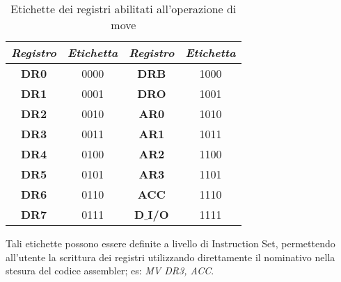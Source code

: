\begin{table}[H]
	\centering
	\fontsize{10}{18}\selectfont
	\begin{tabular}{|p{25mm}|p{25mm}|p{25mm}|p{25mm}|}
		\hline
		\multicolumn{1}{|c|}{\textit{Registro}} &
		\multicolumn{1}{c|}{\textit{Etichetta}} &
		\multicolumn{1}{|c|}{\textit{Registro}} &
		\multicolumn{1}{c|}{\textit{Etichetta}}\\
		
		\hline
		\multicolumn{1}{|c|}{\textbf{DR0}} &
		\multicolumn{1}{c|}{0000} &
		\multicolumn{1}{|c|}{\textbf{DRB}} &
		\multicolumn{1}{c|}{1000}\\
		
		\hline
		\multicolumn{1}{|c|}{\textbf{DR1}} &
		\multicolumn{1}{c|}{0001} &
		\multicolumn{1}{|c|}{\textbf{DRO}} &
		\multicolumn{1}{c|}{1001}\\
		
		\hline
		\multicolumn{1}{|c|}{\textbf{DR2}} &
		\multicolumn{1}{c|}{0010} &
		\multicolumn{1}{|c|}{\textbf{AR0}} &
		\multicolumn{1}{c|}{1010}\\
		
		\hline
		\multicolumn{1}{|c|}{\textbf{DR3}} &
		\multicolumn{1}{c|}{0011} &
		\multicolumn{1}{|c|}{\textbf{AR1}} &
		\multicolumn{1}{c|}{1011}\\
		
		\hline
		\multicolumn{1}{|c|}{\textbf{DR4}} &
		\multicolumn{1}{c|}{0100} &
		\multicolumn{1}{|c|}{\textbf{AR2}} &
		\multicolumn{1}{c|}{1100}\\
		
		\hline
		\multicolumn{1}{|c|}{\textbf{DR5}} &
		\multicolumn{1}{c|}{0101} &
		\multicolumn{1}{|c|}{\textbf{AR3}} &
		\multicolumn{1}{c|}{1101}\\
		
		\hline
		\multicolumn{1}{|c|}{\textbf{DR6}} &
		\multicolumn{1}{c|}{0110} &
		\multicolumn{1}{|c|}{\textbf{ACC}} &
		\multicolumn{1}{c|}{1110}\\
		
		\hline
		\multicolumn{1}{|c|}{\textbf{DR7}} &
		\multicolumn{1}{c|}{0111} &
		\multicolumn{1}{|c|}{\textbf{D$\_$I/O}} &
		\multicolumn{1}{c|}{1111}\\
		
		\hline
	\end{tabular}
	\caption{Etichette dei registri abilitati all'operazione di move}
\end{table}
\noindent
Tali etichette possono essere definite a livello di Instruction Set, permettendo all'utente la scrittura dei registri utilizzando direttamente il nominativo nella stesura del codice assembler; es: \textit{MV DR3, ACC}.\\
